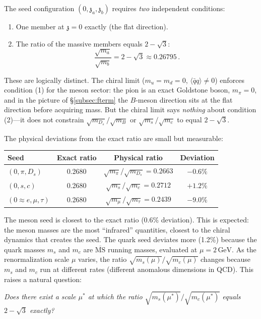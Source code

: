\documentclass[12pt,a4paper]{article}
\newcommand{\GeV}{\,\text{GeV}}
\newcommand{\qqbar}{\langle\bar{q}q\rangle}
\newcommand{\zch}{\mathfrak{z}}
\begin{document}
The seed configuration $(0, \zch_a, \zch_b)$ requires \emph{two} 
independent conditions:
\begin{enumerate}
\item One member at $\zch = 0$ exactly (the flat direction).
\item The ratio of the massive members equals $2 - \sqrt{3}$:
\begin{equation}
\label{eq:seedratio}
\frac{\sqrt{m_a}}{\sqrt{m_b}} = 2 - \sqrt{3} \approx 0.26795\,.
\end{equation}
\end{enumerate}
These are logically distinct. The chiral limit ($m_u = m_d = 0$, 
$\qqbar \neq 0$) enforces condition (1) for the meson sector: the 
pion is an exact Goldstone boson, $m_\pi = 0$, and in the 
picture of \S\ref{subsec:fterm} the $B$-meson direction sits at 
the flat direction before acquiring mass. But the chiral limit says 
\emph{nothing} about condition (2)---it does not constrain 
$\sqrt{m_{D_s}}/\sqrt{m_B}$ or $\sqrt{m_s}/\sqrt{m_c}$ 
to equal $2 - \sqrt{3}$.

The physical deviations from the exact ratio are small but 
measurable:

\begin{center}
\begin{tabular}{lccc}
\toprule
Seed & Exact ratio & Physical ratio & Deviation \\
\midrule
$(0, \pi, D_s)$ & 0.2680 & 
$\sqrt{m_\pi}/\sqrt{m_{D_s}} = 0.2663$ & $-0.6\%$ \\
$(0, s, c)$ & 0.2680 & 
$\sqrt{m_s}/\sqrt{m_c} = 0.2712$ & $+1.2\%$ \\
$(0 \approx e, \mu, \tau)$ & 0.2680 & 
$\sqrt{m_\mu}/\sqrt{m_\tau} = 0.2439$ & $-9.0\%$ \\
\bottomrule
\end{tabular}
\end{center}

The meson seed is closest to the exact ratio (0.6\% deviation). 
This is expected: the meson masses are the most ``infrared'' 
quantities, closest to the chiral dynamics that creates the seed. 
The quark seed deviates more (1.2\%) because the quark masses 
$m_s$ and $m_c$ are $\overline{\text{MS}}$ running masses, 
evaluated at $\mu = 2\GeV$. As the renormalization scale $\mu$ 
varies, the ratio $\sqrt{m_s(\mu)}/\sqrt{m_c(\mu)}$ changes 
because $m_s$ and $m_c$ run at different rates (different anomalous 
dimensions in QCD). This raises a natural question:

\emph{Does there exist a scale $\mu^*$ at which the ratio 
$\sqrt{m_s(\mu^*)}/\sqrt{m_c(\mu^*)}$ equals $2 - \sqrt{3}$ 
exactly?}
\end{document}
